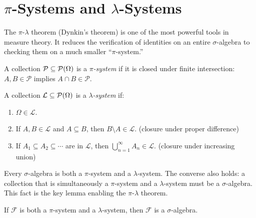 \documentclass[11pt,a4paper]{article}
\begin{document}
\section{$\pi$-Systems and $\lambda$-Systems}
\label{sec:pi_lambda}

The $\pi$-$\lambda$ theorem (Dynkin's theorem) is one of the most
powerful tools in measure theory. It reduces the verification of
identities on an entire $\sigma$-algebra to checking them on a much
smaller ``$\pi$-system.''

\begin{definition}[$\pi$-System]
\label{def:pi_system}
A collection $\mathcal{P} \subseteq \mathcal{P}(\Omega)$ is a
\emph{$\pi$-system} if it is closed under finite intersection:
$A, B \in \mathcal{P}$ implies $A \cap B \in \mathcal{P}$.
\end{definition}

\begin{definition}
\label{def:lambda_system}
A collection $\mathcal{L} \subseteq \mathcal{P}(\Omega)$ is a
\emph{$\lambda$-system} if:
\begin{enumerate}[nosep,label=(\roman*)]
  \item $\Omega \in \mathcal{L}$.
  \item If $A, B \in \mathcal{L}$ and $A \subseteq B$, then
    $B \setminus A \in \mathcal{L}$.
    \hfill(closure under proper difference)
  \item If $A_1 \subseteq A_2 \subseteq \cdots$ are in $\mathcal{L}$,
    then $\bigcup_{n=1}^\infty A_n \in \mathcal{L}$.
    \hfill(closure under increasing union)
\end{enumerate}
\end{definition}

\begin{remark}
Every $\sigma$-algebra is both a $\pi$-system and a $\lambda$-system.
The converse also holds: a collection that is simultaneously a
$\pi$-system and a $\lambda$-system must be a $\sigma$-algebra. This
fact is the key lemma enabling the $\pi$-$\lambda$ theorem.
\end{remark}

\begin{lemma}[$\pi + \lambda = \sigma$]
\label{lem:pi_lambda_sigma}
If $\mathcal{F}$ is both a $\pi$-system and a $\lambda$-system, then
$\mathcal{F}$ is a $\sigma$-algebra.
\end{lemma}
\end{document}
